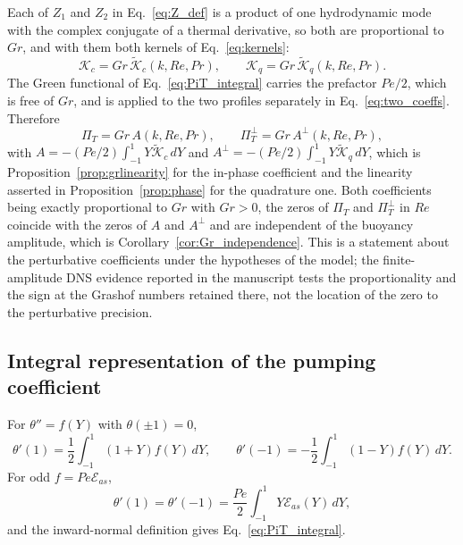 \documentclass[12pt,a4paper]{article}
\newcommand{\Rey}{\mathit{Re}}
\newcommand{\Pe}{\mathit{Pe}}
\newcommand{\Grr}{\mathit{Gr}}
\renewcommand{\Pr}{\mathit{Pr}}
\newcommand{\PiT}{\Pi_T}
\begin{document}
Each of $Z_1$ and $Z_2$ in Eq.~\eqref{eq:Z_def} is a product of one hydrodynamic mode with
the complex conjugate of a thermal derivative, so both are proportional to $\Grr$, and with
them both kernels of Eq.~\eqref{eq:kernels}:
\begin{equation}
  \mathcal K_c=\Grr\,\widetilde{\mathcal K}_c(k,\Rey,\Pr),
  \qquad
  \mathcal K_q=\Grr\,\widetilde{\mathcal K}_q(k,\Rey,\Pr).
\end{equation}
The Green functional of Eq.~\eqref{eq:PiT_integral} carries the prefactor $\Pe/2$, which is
free of $\Grr$, and is applied to the two profiles separately in Eq.~\eqref{eq:two_coeffs}.
Therefore
\begin{equation}
  \PiT=\Grr\,A(k,\Rey,\Pr),
  \qquad
  \PiT^{\perp}=\Grr\,A^{\perp}(k,\Rey,\Pr),
\end{equation}
with $A=-(\Pe/2)\int_{-1}^{1}Y\widetilde{\mathcal K}_c\,dY$ and
$A^{\perp}=-(\Pe/2)\int_{-1}^{1}Y\widetilde{\mathcal K}_q\,dY$,
which is Proposition~\ref{prop:grlinearity} for the in-phase coefficient and the linearity
asserted in Proposition~\ref{prop:phase} for the quadrature one. Both coefficients being
exactly proportional to $\Grr$ with $\Grr>0$, the zeros of $\PiT$ and $\PiT^{\perp}$ in
$\Rey$ coincide with the zeros of $A$ and $A^{\perp}$ and are independent of the buoyancy
amplitude, which is Corollary~\ref{cor:Gr_independence}. This is a statement about the
perturbative coefficients under the hypotheses of the model; the finite-amplitude DNS
evidence reported in the manuscript tests the proportionality and the sign at the Grashof
numbers retained there, not the location of the zero to the perturbative precision.

\subsection{Integral representation of the pumping coefficient}
\label{app:mean_solution}

For $\theta''=f(Y)$ with $\theta(\pm1)=0$,
\begin{equation}
  \theta'(1)=\frac12\int_{-1}^{1}(1+Y)f(Y)\,dY,
  \qquad
  \theta'(-1)=-\frac12\int_{-1}^{1}(1-Y)f(Y)\,dY.
\end{equation}
For odd $f=\Pe\mathcal E_{as}$,
\begin{equation}
  \theta'(1)=\theta'(-1)=\frac{\Pe}{2}\int_{-1}^{1}Y\mathcal E_{as}(Y)\,dY,
\end{equation}
and the inward-normal definition gives Eq.~\eqref{eq:PiT_integral}.
\end{document}
